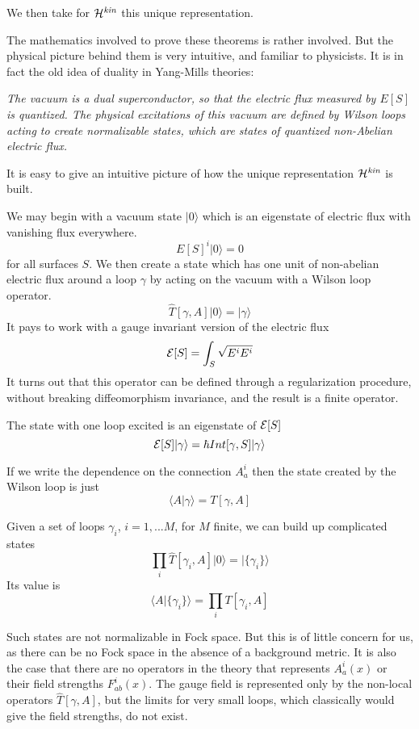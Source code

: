 \documentclass[12pt]{article}
\newcommand{\f}{\begin{equation}}
\newcommand{\ff}{\end{equation}}
\begin{document}
We then take for ${\cal H}^{\it kin}$ this unique representation.


The mathematics involved to prove these theorems is rather involved.
But the physical picture behind them is very intuitive, and familiar to
physicists. It is in fact the old idea of   duality in Yang-Mills theories: 

{\it The vacuum 
is a dual superconductor, so that the electric flux measured by
$E[S]$ is quantized. The  
physical excitations of this vacuum are defined by 
Wilson loops acting to create normalizable states, which are
states of quantized non-Abelian electric flux.}  

It is easy to give an intuitive picture of how the unique representation
${\cal H}^{\it kin}$ is built. 

We may begin with a vacuum state $|0\rangle$ which is an eigenstate
of electric flux with vanishing flux everywhere.
\f
E[S]^i  |0\rangle =0
\ff
for all surfaces $S$.  We then create a state which has
one unit of non-abelian electric flux around a loop $\gamma$
by acting on the vacuum with a Wilson loop operator. 
\f
 \hat{T}[\gamma , A] |0\rangle =   |\gamma \rangle 
\label{naive1}
\ff
It pays to work with a gauge invariant version of the electric flux
\f
{\cal E}[S] = \int_S \sqrt{E^i E^i }
\ff
It turns out that this operator can be defined through a regularization
procedure, without breaking diffeomorphism invariance, and the result
is a finite operator. 

The state with one loop excited is an eigenstate of ${\cal E}[S] $
\f
{\cal E}[S] |\gamma \rangle = \hbar Int [\gamma , S] |\gamma \rangle 
\ff
 
If we write the dependence on the connection $A_a^i$ then the
state created by the Wilson loop is just
\f
\langle A|\gamma \rangle = T[\gamma , A] 
\ff


Given a set of loops $\gamma_i$, $i=1,...M$, for $M$ finite, we can
build up complicated states
\f
 \prod_i \hat{T}[\gamma_i , A] |0\rangle =|  \{   \gamma_i \}  \rangle
\label{naive2}
\ff
Its value is 
\f
\langle A | \{ \gamma_i \} \rangle = \prod_i T[\gamma_i , A] 
\ff

Such states are not normalizable in Fock space. But this is of little 
concern for us, as there can be no Fock space in the absence of a 
background metric.  It is also the case that there are no operators in the theory
that represents $A^i_a (x)$ or their field strengths $F_{ab}^i (x)$. 
The gauge field is represented only by the non-local operators 
$\hat{T}[\gamma , A] $, but the limits for very small loops, which classically 
would give the field strengths,  do not exist. 
\end{document}
